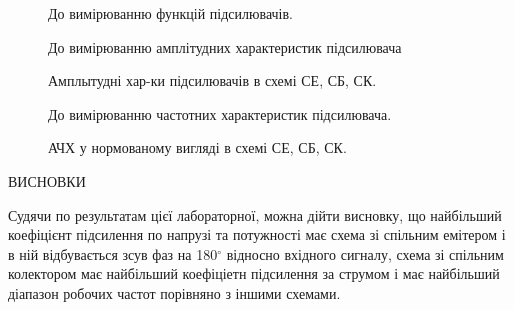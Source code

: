 \documentclass[a4paper,14pt]{extreport}
\begin{document}
\begin{figure}[h]
До вимірюванню функцій підсилювачів.
\label{ris2}
\end{figure}

\clearpage
\begin{figure}[h]
До вимірюванню амплітудних характеристик підсилювача
\label{ris3}
\end{figure}

\begin{figure}[h]
\label{ris31}
\caption{Амплытудні хар-ки підсилювачів в схемі СЕ, СБ, СК.}
\end{figure}


\begin{figure}[h]
До вимірюванню частотних характеристик підсилювача.
\label{ris4}
\end{figure}


\begin{figure}[h]
\label{ris5}
\caption{АЧХ у нормованому вигляді в схемі СЕ, СБ, СК.}
\end{figure}

\clearpage
\newpage

\begin{center}ВИСНОВКИ\end{center}
Судячи по результатам цієї лабораторної, можна дійти висновку, що найбільший коефіцієнт підсилення по напрузі та потужності має схема зі спільним емітером і в ній відбувається зсув фаз на 180$^\circ$ відносно вхідного сигналу, схема зі спільним колектором має найбільший коефіціетн підсилення за струмом і має найбільший діапазон робочих частот порівняно з іншими схемами.

\clearpage
\newpage

\begin{figure}[h]
\end{figure}
\end{document}
